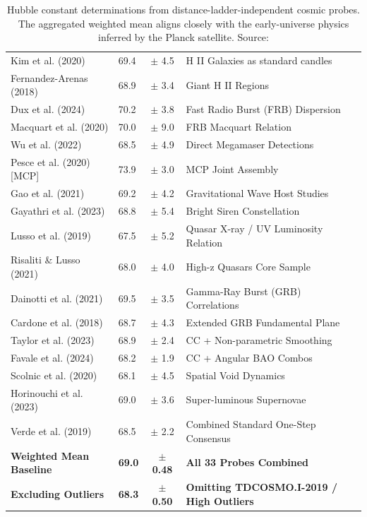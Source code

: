 \documentclass{book}
\begin{document}
\begin{table}[h!]
\begin{tabular}{llcl}
			Kim et al. (2020)             & 69.4  & $\pm$ 4.5  & H II Galaxies as standard candles \\
			Fernandez-Arenas (2018)       & 68.9  & $\pm$ 3.4  & Giant H II Regions \\
			Dux et al. (2024)             & 70.2  & $\pm$ 3.8  & Fast Radio Burst (FRB) Dispersion \\
			Macquart et al. (2020)        & 70.0  & $\pm$ 9.0  & FRB Macquart Relation \\
			Wu et al. (2022)              & 68.5  & $\pm$ 4.9  & Direct Megamaser Detections \\
			Pesce et al. (2020) [MCP]     & 73.9  & $\pm$ 3.0  & MCP Joint Assembly \\
			Gao et al. (2021)             & 69.2  & $\pm$ 4.2  & Gravitational Wave Host Studies \\
			Gayathri et al. (2023)        & 68.8  & $\pm$ 5.4  & Bright Siren Constellation \\
			Lusso et al. (2019)           & 67.5  & $\pm$ 5.2  & Quasar X-ray / UV Luminosity Relation \\
			Risaliti \& Lusso (2021)      & 68.0  & $\pm$ 4.0  & High-z Quasars Core Sample \\
			Dainotti et al. (2021)        & 69.5  & $\pm$ 3.5  & Gamma-Ray Burst (GRB) Correlations \\
			Cardone et al. (2018)         & 68.7  & $\pm$ 4.3  & Extended GRB Fundamental Plane \\
			Taylor et al. (2023)          & 68.9  & $\pm$ 2.4  & CC + Non-parametric Smoothing \\
			Favale et al. (2024)          & 68.2  & $\pm$ 1.9  & CC + Angular BAO Combos \\
			Scolnic et al. (2020)         & 68.1  & $\pm$ 4.5  & Spatial Void Dynamics \\
			Horinouchi et al. (2023)      & 69.0  & $\pm$ 3.6  & Super-luminous Supernovae \\
			Verde et al. (2019)           & 68.5  & $\pm$ 2.2  & Combined Standard One-Step Consensus \\
			\hline
			\textbf{Weighted Mean Baseline} & \textbf{69.0} & \textbf{$\pm$ 0.48} & \textbf{All 33 Probes Combined} \\
			\textbf{Excluding Outliers}     & \textbf{68.3} & \textbf{$\pm$ 0.50} & \textbf{Omitting TDCOSMO.I-2019 / High Outliers} \\
			\hline\hline
		\end{tabular}
		\normalsize
		\caption{Hubble constant determinations from distance-ladder-independent cosmic probes. The aggregated weighted mean aligns closely with the early-universe physics inferred by the Planck satellite. Source: \cite{perivolaropoulos2024hubbletensiondistanceladder}}
		\label{tab:complete_one_step}
	\end{table}
	
\end{document}
